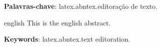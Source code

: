 \documentclass[
	12pt,				%
	twoside,			%
	a4paper,			%
	english,			%
	brazil			%
	]{abntex2}
\begin{document}
\begin{dedicatoria}
   \vspace*{\fill}
   \centering
   \noindent
   \textit{} \vspace*{\fill}
\end{dedicatoria}
\begin{agradecimentos}

\end{agradecimentos}
\begin{epigrafe}
    \vspace*{\fill}
	\begin{flushright}
		\textit{}
	\end{flushright}
\end{epigrafe}
\setlength{\absparsep}{18pt} %
\begin{resumo}


 \textbf{Palavras-chave}: latex.abntex.editoração de texto.
\end{resumo}

\begin{resumo}[Abstract]
 \begin{otherlanguage*}{english}
   This is the english abstract.

   \vspace{\onelineskip}
 
   \noindent 
   \textbf{Keywords}: latex.abntex.text editoration.
 \end{otherlanguage*}
\end{resumo}
\listoffigures*
\cleardoublepage
\listoftables*
\cleardoublepage
\tableofcontents*
\cleardoublepage
\textual

\setcounter{page}{1}











\end{document}
